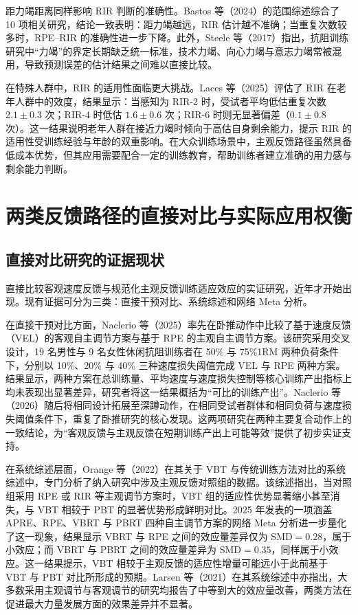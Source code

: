 \documentclass[UTF8,zihao=-4,twoside,openany]{ctexbook}
\begin{document}
距力竭距离同样影响 RIR 判断的准确性。Bastos 等（2024）的范围综述综合了 10 项相关研究，结论一致表明：距力竭越远，RIR 估计越不准确；当重复次数较多时，RPE--RIR 的准确性进一步下降。此外，Steele 等（2017）指出，抗阻训练研究中“力竭”的界定长期缺乏统一标准，技术力竭、向心力竭与意志力竭常被混用，导致预测误差的估计结果之间难以直接比较。

在特殊人群中，RIR 的适用性面临更大挑战。Laces 等（2025）评估了 RIR 在老年人群中的效度，结果显示：当感知为 RIR-2 时，受试者平均低估重复次数 $2.1\pm0.3$ 次；RIR-4 时低估 $1.6\pm0.6$ 次；RIR-6 时则无显著偏差（$0.1\pm0.8$ 次）。这一结果说明老年人群在接近力竭时倾向于高估自身剩余能力，提示 RIR 的适用性受训练经验与年龄的双重影响。在大众训练场景中，主观反馈路径虽然具备低成本优势，但其应用需要配合一定的训练教育，帮助训练者建立准确的用力感与剩余能力判断。

\section{两类反馈路径的直接对比与实际应用权衡}

\subsection{直接对比研究的证据现状}
直接比较客观速度反馈与规范化主观反馈训练适应效应的实证研究，近年才开始出现。现有证据可分为三类：直接干预对比、系统综述和网络 Meta 分析。

在直接干预对比方面，Naclerio 等（2025）率先在卧推动作中比较了基于速度反馈（VEL）的客观自主调节方案与基于 RPE 的主观自主调节方案。该研究采用交叉设计，19 名男性与 9 名女性休闲抗阻训练者在 50\% 与 75\%1RM 两种负荷条件下，分别以 10\%、20\% 与 40\% 三种速度损失阈值完成 VEL 与 RPE 两种方案。结果显示，两种方案在总训练量、平均速度与速度损失控制等核心训练产出指标上均未表现出显著差异，研究者将这一结果概括为“可比的训练产出”。Naclerio 等（2026）随后将相同设计拓展至深蹲动作，在相同受试者群体和相同负荷与速度损失阈值条件下，重复了卧推研究的核心发现。这两项研究在两种主要复合动作上的一致结论，为“客观反馈与主观反馈在短期训练产出上可能等效”提供了初步实证支持。

在系统综述层面，Orange 等（2022）在其关于 VBT 与传统训练方法对比的系统综述中，专门分析了纳入研究中涉及主观反馈对照组的数据。该综述指出，当对照组采用 RPE 或 RIR 等主观调节方案时，VBT 组的适应性优势显著缩小甚至消失，与 VBT 相较于 PBT 的显著优势形成鲜明对比。2025 年发表的一项涵盖 APRE、RPE、VBRT 与 PBRT 四种自主调节方案的网络 Meta 分析进一步量化了这一现象，结果显示 VBRT 与 RPE 之间的效应量差异仅为 $\text{SMD}=0.28$，属于小效应；而 VBRT 与 PBRT 之间的效应量差异为 $\text{SMD}=0.35$，同样属于小效应。这一结果提示，VBT 相较于主观反馈的适应性增量可能远小于此前基于 VBT 与 PBT 对比所形成的预期。Larsen 等（2021）在其系统综述中亦指出，大多数采用主观调节与客观调节的研究均报告了中等到大的效应量改善，两类方法在促进最大力量发展方面的效果差异并不显著。
\end{document}
